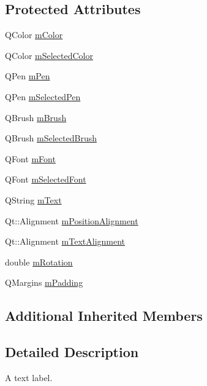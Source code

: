 \subsection*{Protected Attributes}
\begin{DoxyCompactItemize}
\item 
Q\+Color \mbox{\hyperlink{class_q_c_p_item_text_a8407f284ad867f627878cc26ef433d08}{m\+Color}}
\item 
Q\+Color \mbox{\hyperlink{class_q_c_p_item_text_a7eb64e42f5f7998a97d8907ad25933c1}{m\+Selected\+Color}}
\item 
Q\+Pen \mbox{\hyperlink{class_q_c_p_item_text_aa02388705dbbff1bf7b8aa872b5f579c}{m\+Pen}}
\item 
Q\+Pen \mbox{\hyperlink{class_q_c_p_item_text_a8eaec649606d6ead2d8d4dcb5691777c}{m\+Selected\+Pen}}
\item 
Q\+Brush \mbox{\hyperlink{class_q_c_p_item_text_a2535911875faa459b8337f2efccb5cb8}{m\+Brush}}
\item 
Q\+Brush \mbox{\hyperlink{class_q_c_p_item_text_a28ccd097b42a216d81db9c6869f54a59}{m\+Selected\+Brush}}
\item 
Q\+Font \mbox{\hyperlink{class_q_c_p_item_text_a1dc87fe2a824820d549ffd7e644eef8d}{m\+Font}}
\item 
Q\+Font \mbox{\hyperlink{class_q_c_p_item_text_a6702f141fae590b2f4f1ec02fe9f8bd5}{m\+Selected\+Font}}
\item 
Q\+String \mbox{\hyperlink{class_q_c_p_item_text_a2dec3e08c11f51639629374ecec3bd62}{m\+Text}}
\item 
Qt\+::\+Alignment \mbox{\hyperlink{class_q_c_p_item_text_a6c27f7dc1a962a04b32430cf99f04654}{m\+Position\+Alignment}}
\item 
Qt\+::\+Alignment \mbox{\hyperlink{class_q_c_p_item_text_acdb2e50c38e83da00f083771efbd213f}{m\+Text\+Alignment}}
\item 
double \mbox{\hyperlink{class_q_c_p_item_text_ac37df0061552225d2277e1ee3b48f2cb}{m\+Rotation}}
\item 
Q\+Margins \mbox{\hyperlink{class_q_c_p_item_text_ae7b3ef0ce6046efd4b346d28f2e1fb67}{m\+Padding}}
\end{DoxyCompactItemize}
\subsection*{Additional Inherited Members}


\subsection{Detailed Description}
A text label. 


